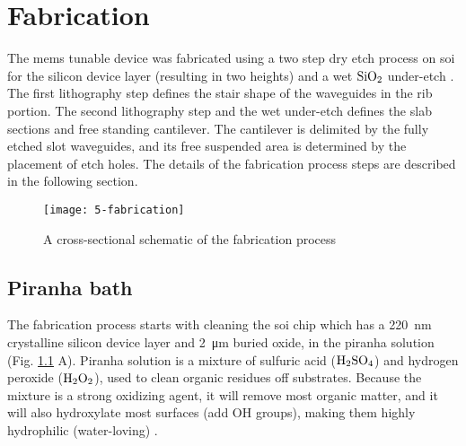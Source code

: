\documentclass[../report.tex]{subfiles}
\begin{document}
	
	
\chapter{Fabrication}\label{sec:fab_process}

The \gls{mems} tunable device was fabricated using a two step dry etch process on \gls{soi} for the silicon device layer (resulting in two heights) and a wet $\mathrm{SiO_2}$ under-etch \cite{errando-herranz_low-power_2015}. The first lithography step defines the stair shape of the waveguides in the rib portion. The second lithography step and the wet under-etch defines the slab sections and free standing cantilever. The cantilever is delimited by the fully etched slot waveguides, and its free suspended area is determined by the placement of etch holes. The details of the fabrication process steps are described in the following section.

\begin{figure}[h] %
	\centering
	\texttt{[image: 5-fabrication]}
	\caption{A cross-sectional schematic of the fabrication process}
	\label{fig:5_fabrication}
\end{figure}


\section{Piranha bath}			
The fabrication process starts with cleaning the \gls{soi} chip which has a \SI{220}{\nano \meter} crystalline silicon device layer and \SI{2}{\micro \meter} buried oxide, in the piranha solution (Fig. \ref{fig:5_fabrication} A). Piranha solution is a mixture of sulfuric acid ($\mathrm{H_2SO_4}$) and hydrogen peroxide ($\mathrm{H_2O_2}$), used to clean organic residues off substrates. Because the mixture is a strong oxidizing agent, it will remove most organic matter, and it will also hydroxylate most surfaces (add OH groups), making them highly hydrophilic (water-loving) \cite{piranha_bath}. 
 
\end{document}
